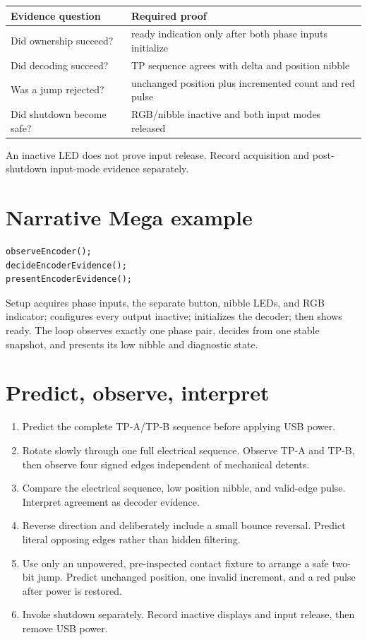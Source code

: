 \documentclass[11pt]{article}
\begin{document}
\begin{tabularx}{\linewidth}{@{}X X@{}}
\toprule
Evidence question & Required proof\\
\midrule
Did ownership succeed? & ready indication only after both phase inputs initialize\\
Did decoding succeed? & TP sequence agrees with delta and position nibble\\
Was a jump rejected? & unchanged position plus incremented count and red pulse\\
Did shutdown become safe? & RGB/nibble inactive and both input modes released\\
\bottomrule
\end{tabularx}

An inactive LED does not prove input release. Record acquisition and
post-shutdown input-mode evidence separately.

\section{Narrative Mega example}

\begin{lstlisting}[style=adkcpp]
observeEncoder();
decideEncoderEvidence();
presentEncoderEvidence();
\end{lstlisting}

Setup acquires phase inputs, the separate button, nibble LEDs, and RGB
indicator; configures every output inactive; initializes the decoder; then
shows ready. The loop observes exactly one phase pair, decides from one stable
snapshot, and presents its low nibble and diagnostic state.

\section{Predict, observe, interpret}

\begin{enumerate}
  \item Predict the complete TP-A/TP-B sequence before applying USB power.
  \item Rotate slowly through one full electrical sequence. Observe TP-A and
        TP-B, then observe four signed edges independent of mechanical detents.
  \item Compare the electrical sequence, low position nibble, and valid-edge
        pulse. Interpret agreement as decoder evidence.
  \item Reverse direction and deliberately include a small bounce reversal.
        Predict literal opposing edges rather than hidden filtering.
  \item Use only an unpowered, pre-inspected contact fixture to arrange a safe
        two-bit jump. Predict unchanged position, one invalid increment, and a
        red pulse after power is restored.
  \item Invoke shutdown separately. Record inactive displays and input
        release, then remove USB power.
\end{enumerate}
\end{document}
